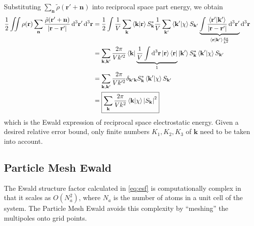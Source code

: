 \documentclass[12pt]{extarticle}
\renewcommand{\bf}{\mathbf}
\begin{document}
    Substituting \(\sum_{\bf n} \tilde{\rho} ( \bf r' + \bf n)\) into reciprocal space part energy, we obtain \begin{align*}
        \frac{1}{2} \iint \rho(\bf r) \sum_{\bf n} \frac{\tilde{\rho} \pqty{ \bf r' + \bf n}}{\abs{\bf r - \bf r'}} \dd[3]{\bf r'} \dd[3]{\bf r} 
        &= \frac{1}{2} \int \frac{1}{V}\sum_{\bf k} \bra{\bf k} \ket{\bf r} S_{\bf k}^* \frac{1}{V}\sum_{\bf k'}   \bra{\bf k'}  \ket{\chi }  S_{\bf k'} \underbrace{\int \frac{\bra{\bf r'} \ket{\bf k'}}{\abs{\bf r - \bf r'}} \dd[3]{\bf r'} }_{\bra{\bf r} \ket{\bf k'} \frac{4 \pi}{k^2}} \dd[3]{\bf r} \\
        &= \sum_{\bf k, \bf k'} \frac{2\pi}{Vk'^2}   \bra{\bf k} \underbrace{\frac{1}{V} \int  \dd[3]{\bf r}\ket{\bf r} \bra{\bf r}}_1 \ket{\bf k'} S_{\bf k}^*   \bra{\bf k'}  \ket{\chi }  S_{\bf k'}\\
        &= \sum_{\bf k, \bf k'} \frac{2\pi}{Vk'^2}   \delta_{\bf k' \bf k} S_{\bf k}^*   \bra{\bf k'}  \ket{\chi }  S_{\bf k'}\\
        &= \boxed{\sum_{ \bf k} \frac{2\pi}{Vk^2}  \bra{\bf k}  \ket{\chi } \abs{ S_{\bf k}}^2}
    \end{align*}
    which is the Ewald expression of reciprocal space electrostatic energy. Given a desired relative error bound, only finite numbers \(K_1, K_2, K_3\) of \(\bf k\) need to be taken into account.
    \subsection{Particle Mesh Ewald}
    The Ewald structure factor calculated in \cref{eq:esf} is computationally complex in that it scales as \(O(N_a^2)\), where \(N_a\) is the number of atoms in a unit cell of the system. The Particle Mesh Ewald avoids this complexity by ``meshing'' the multipoles onto grid points.
\end{document}
